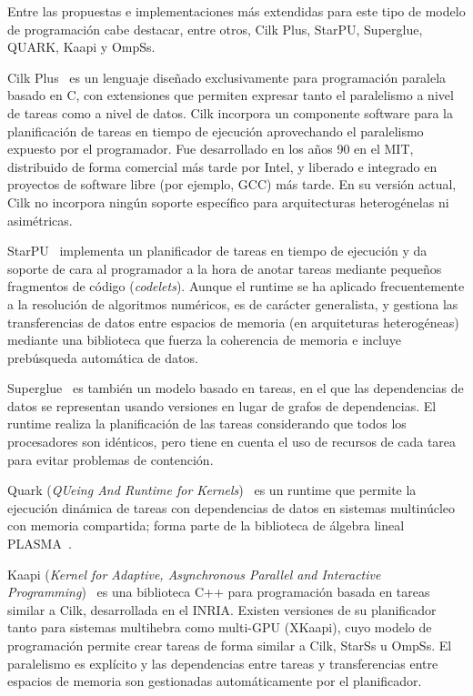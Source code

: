 Entre las propuestas e implementaciones más extendidas para este tipo de modelo de programación cabe
destacar, entre otros, Cilk Plus, StarPU, Superglue, QUARK, Kaapi y OmpSs. 

Cilk Plus~\cite{cilkweb,Blumofe:Cilk,Frigo:Cilk,Leiserson:Cilk} es un lenguaje diseñado exclusivamente
para programación paralela basado en C, con extensiones que permiten expresar tanto el paralelismo a nivel
de tareas como a nivel de datos. Cilk incorpora un componente software para la planificación de tareas
en tiempo de ejecución aprovechando el paralelismo expuesto por el programador. Fue desarrollado en los
años 90 en el MIT, distribuido de forma comercial más tarde por Intel, y liberado e integrado en proyectos
de software libre (por ejemplo, GCC) más tarde. En su versión actual, Cilk no incorpora ningún soporte 
específico para arquitecturas heterogénelas ni asimétricas.

StarPU~\cite{starpuweb,Augonnet:2011:SUP:1951453.1951454,agullo:hal-01223573,agullo:hal-01120507}
implementa un planificador de tareas en tiempo de ejecución y da soporte de
cara al programador a la hora de anotar tareas mediante pequeños fragmentos
de código ({\em codelets}). Aunque el runtime se ha aplicado frecuentemente
a la resolución de algoritmos numéricos, es de carácter generalista, y
gestiona las transferencias de datos entre espacios de memoria (en
arquiteturas heterogéneas) mediante una biblioteca que fuerza la coherencia
de memoria e incluye prebúsqueda automática de datos.

Superglue~\cite{superglueweb,tillenius:superglue,tillenius:superglue2} es
también un modelo basado en tareas, en el que las dependencias de datos se
representan usando versiones en lugar de grafos de dependencias. El runtime
realiza la planificación de las tareas considerando que todos los
procesadores son idénticos, pero tiene en cuenta el uso de recursos de cada
tarea para evitar problemas de contención.

Quark ({\em QUeing And Runtime for Kernels})~\cite{quarkweb,icl:609,Haidar}
es un runtime que permite la ejecución dinámica de tareas con dependencias
de datos en sistemas multinúcleo con memoria compartida; forma parte de la
biblioteca de álgebra lineal PLASMA~\cite{Abalenkovs}.

Kaapi ({\em Kernel for Adaptive, Asynchronous Parallel and Interactive Programming})~\cite{kaapiweb,Gautier:2013:XRS:2510661.2511383,Gautier:2007:KTS:1278177.1278182}
es una biblioteca C++ para programación basada en tareas similar a Cilk, desarrollada en el INRIA.
Existen versiones de su planificador tanto para sistemas multihebra como multi-GPU (XKaapi), cuyo
modelo de programación permite crear tareas de forma similar a Cilk, StarSs u OmpSs. El paralelismo
es explícito y las dependencias entre tareas y transferencias entre espacios de memoria son 
gestionadas automáticamente por el planificador.

